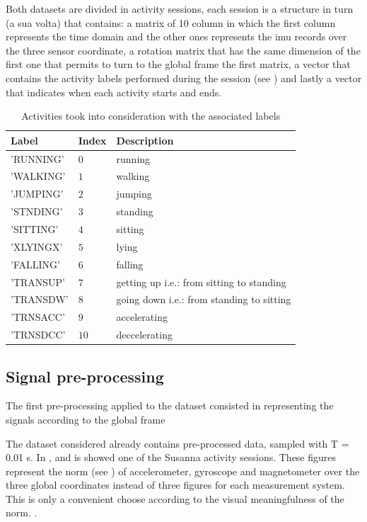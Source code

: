 Both datasets are divided in activity sessions, each session is a structure in turn (a sua volta) that contains: a matrix of 10 column in which the first column represents the time domain and the other ones represents the \gls{imu} records over the three sensor coordinate, a rotation matrix that has the same dimension of the first one that permits to turn to the global frame the first matrix, a vector that contains the activity labels performed during the session (see ) and lastly a vector that indicates when each activity starts and ends.

\begin{table}[htp]
\small
	\centering
		\renewcommand{\arraystretch}{1}%
	\begin{tabular}{@{}lll@{}}
	\toprule
	Label & Index & Description\\ \midrule
	'RUNNING' & $0$ & running \\
	'WALKING' & $1$ & walking \\
	'JUMPING' & $2$ & jumping  \\
	'STNDING' & $3$ & standing \\ 
	'SITTING' & $4$ & sitting\\
	'XLYINGX' & $5$ & lying \\
	'FALLING' & $6$ & falling \\
	'TRANSUP' & $7$ & getting up i.e.: from sitting to standing \\
	'TRANSDW' & $8$ & going down i.e.: from standing to sitting\\
	'TRNSACC' & $9$ & accelerating\\
	'TRNSDCC' & $10$ & deccelerating\\
	\bottomrule
	\end{tabular}
	\caption{Activities took into consideration with the associated labels}
	\label{tab:label}
\end{table}


\subsection{Signal pre-processing}
The first pre-processing applied to the dataset consisted in representing the signals according to the global frame


The dataset considered already contains pre-processed data, sampled with T = 0.01 s. In ,  and  is showed one of the Susanna activity sessions. These figures represent the norm (see ) of accelerometer, gyroscope and magnetometer over the three global coordinates instead of three figures for each measurement system. This is only a convenient choose according to the visual meaningfulness of the norm. 
.


